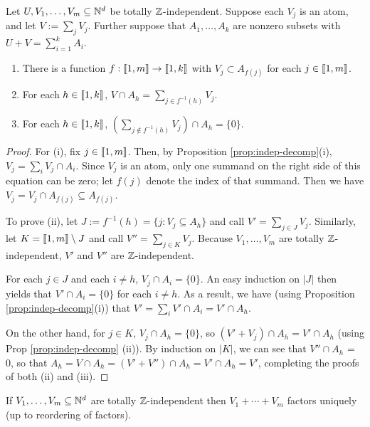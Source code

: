 \begin{lemma} \label{lem:indep-atom-decomp}
Let $U, V_1,\dots, V_m\subseteq \mathbb{N}^d$ be totally $\mathbb{Z}$-independent.
Suppose each $V_j$ is an atom, and let $V := \sum_j V_j$.
Further suppose that $A_1,\dots, A_k$ are nonzero subsets with $U+V = \sum_{i=1}^k A_i$.
\begin{enumerate}[label={\rm (\roman{*})}]
	\item There is a function $f: \llbracket 1,m \rrbracket \to \llbracket 1,k \rrbracket$ with $V_j \subset A_{f(j)}$ for each $j\in \llbracket 1,m\rrbracket$.
	\item For each $h\in \llbracket 1,k\rrbracket$, $V\cap A_h = \sum\limits_{j\in f^{-1}(h)} V_j$.
	\item For each $h\in \llbracket 1,k\rrbracket$, $\left( \sum\limits_{j\notin f^{-1}(h)} V_j \right) \cap A_h = \{0\}$.
\end{enumerate}
\end{lemma}

\begin{proof}
For (i), fix $j\in \llbracket 1,m \rrbracket$.
Then, by Proposition \ref{prop:indep-decomp}(i), $V_j = \sum_i V_j \cap A_i$.
Since $V_j$ is an atom, only one summand on the right side of this equation can be zero; let $f(j)$ denote the index of that summand.
Then we have $V_j = V_j \cap A_{f(j)} \subseteq A_{f(j)}$.

To prove (ii), let $J := f^{-1}(h) = \{j: V_j \subseteq A_h\}$ and call $V' = \sum_{j\in J} V_j$.
Similarly, let $K = \llbracket 1,m \rrbracket \setminus J$ and call $V'' = \sum_{j\in K} V_j$.
Because $V_1,\dots, V_m$ are totally $\mathbb{Z}$-independent, $V'$ and $V''$ are $\mathbb{Z}$-independent.

For each $j\in J$ and each $i\neq h$, $V_j\cap A_i = \{0\}$. 
An easy induction on $|J|$ then yields that $V' \cap A_i = \{0\}$ for each $i\neq h$.
As a result, we have (using Proposition \ref{prop:indep-decomp}(i)) that $V' = \sum_i V'\cap A_i = V' \cap A_h$.

On the other hand, for $j\in K$, $V_j\cap A_h = \{0\}$, so $(V' + V_j) \cap A_h = V' \cap A_h$ (using Prop \ref{prop:indep-decomp} (ii)).
By induction on $|K|$, we can see that $V'' \cap A_h$ = 0, so that $A_h = V\cap A_h = (V' + V'')\cap A_h = V' \cap A_h = V'$, completing the proofs of both (ii) and (iii).
\end{proof}

\begin{thm} \label{thm:ind-atoms}
If $V_1,\dots,V_m\subseteq \mathbb{N}^d$ are totally $\mathbb{Z}$-independent then $V_1+\cdots+V_m$ factors uniquely (up to reordering of factors).
\end{thm}

